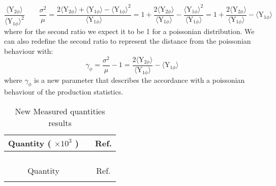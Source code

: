 \begin{equation}
\frac{\langle \text{Y}_{2\phi} \rangle} {\langle \text{Y}_{1\phi} \rangle^2}\qquad \frac{\sigma^2}{\mu} = \frac{2\langle \text{Y}_{2\phi} \rangle + \langle \text{Y}_{1\phi} \rangle - \langle \text{Y}_{1\phi} \rangle^2}{\langle \text{Y}_{1\phi} \rangle} = 1 + \frac{2\langle \text{Y}_{2\phi} \rangle}{\langle \text{Y}_{1\phi} \rangle} - \frac{ \langle \text{Y}_{1\phi} \rangle^2}{\langle \text{Y}_{1\phi} \rangle} = 1 + \frac{2\langle \text{Y}_{2\phi} \rangle}{\langle \text{Y}_{1\phi} \rangle} - \langle \text{Y}_{1\phi} \rangle
\label{eq:}
\end{equation}
where for the second ratio we expect it to be 1 for a poissonian distribution. We can also redefine the second ratio to represent the distance from the poissonian behaviour with:
 \begin{equation}
\gamma_{\phi} =  \frac{\sigma^2}{\mu} - 1 = \frac{2\langle \text{Y}_{2\phi} \rangle}{\langle \text{Y}_{1\phi} \rangle} - \langle \text{Y}_{1\phi} \rangle
\label{eq:}
\end{equation}
where $\gamma_\phi$ is a new parameter that describes the accordance with a poissonian behaviour of the production statistics. 

\begin{table}
	\centering
	\begin{tabular}{ c |l c }
		\hline
		Quantity ( $\times 10^3$ )														&																&Ref.\\
		\hline
		\hline
		\multirow{2}{*}{\color{red}{dN$_{\phi\phi}$/dy}}										&\multirow{2}{*}{\color{red}{1.54 $\pm$0.08	$\pm$0.24$^{+ 0.11}_{-0.05}$}}		&\multirow{2}{*}{\color{red}{This work}}\\
		\\
		\hline
		\multirow{2}{*}{\color{red}{$\langle\text{Y}_{\phi\phi}\rangle$/$\langle\text{Y}_{\phi}\rangle$}}	&\multirow{2}{*}{\color{red}{46.7 $\pm$2.5		$\pm$4.7 	$^{+ 0}_{-0}$}}			&\multirow{2}{*}{\color{red}{This work}}\\
		\\
		\hline
		\multirow{2}{*}{\color{red}{$\sigma^2_{\phi}$}}										&\multirow{2}{*}{\color{red}{35.0 $\pm$3.4 	$\pm$3.2 $^{+ 2.5}_{-1.2}$}}		&\multirow{2}{*}{\color{red}{This work}}\\
		\\
		\hline
		\multirow{2}{*}{\color{red}{$\gamma_{\phi}$}}										&\multirow{2}{*}{\color{red}{60.5 $\pm$6.1		$\pm$6.5	$^{+ 1.2}_{-2.4}$}}		&\multirow{2}{*}{\color{red}{This work}}\\
		\\
		\hline
		\hline
		Quantity																	&																&Ref.\\
		\hline
		\hline
		\multirow{2}{*}{\color{red}{$\langle\text{Y}_{\phi\phi}\rangle$/$\langle\text{Y}_{\phi}\rangle^2$}}	&\multirow{2}{*}{\color{red}{1.42 $\pm$0.09	$\pm$0.07$^{+ 0.05}_{-0.04}$}}		&\multirow{2}{*}{\color{red}{This work}}\\
		\\
		\hline
	\end{tabular}
	\caption{New Measured quantities results}
	\label{tab:new_parameters}
\end{table}

